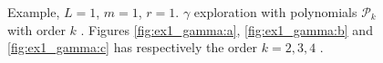 \begin{figure}
    \caption{ Example, $L=1$, $m=1$, $r=1$. $\gamma$ exploration with polynomials $\mathcal{P}_{k} $ with order $k$ . Figures \ref{fig:ex1_gamma:a}, \ref{fig:ex1_gamma:b} and \ref{fig:ex1_gamma:c} has respectively the order $k=2,3, 4$ .  }
    \label{fig:ex1_conv}
\end{figure}


